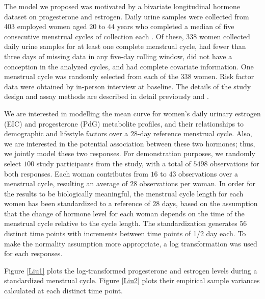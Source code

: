 \documentclass[article,lineno]{biometrika}
\begin{document}
The model we proposed was motivated by a bivariate longitudinal hormone dataset on progesterone and estrogen.
Daily urine samples were collected from 403 employed women aged $20$ to $44$ years who completed a median of five consecutive menstrual cycles of collection each \cite{Gold:Eske:Lasl:Samu:O'Nei:Over:Sche:quan:1995}. Of these, $338$ women collected daily urine samples for at least one complete menstrual cycle, had fewer than three days of missing data in any five-day rolling window, did not have a conception in the analyzed cycles, and had complete covariate information. One menstrual cycle was randomly selected from each of the $338$ women. 
Risk factor data were obtained by in-person interview at baseline. The details of the study design and assay methods are described in detail previously \cite{Gold:Eske:Lasl:Samu:O'Nei:Over:Sche:quan:1995} and \cite{Gold:Eske:Hamm:Lasl:Samu:O'Nei:Hine:Over:Sche:quan:1995}. 


We are interested in modelling the mean curve for women's daily urinary estrogen (EIC) and progesterone (PdG) metabolite profiles, and their relationships to demographic and lifestyle factors over a $28$-day reference menstrual cycle. Also, we are interested in the potential association between these two hormones; thus, we jointly model these two responses. 
For demonstration purposes, we randomly select  $100$ study participants from the study, with a total of $5498$ observations for both responses. 
Each woman contributes from $16$ to $43$ observations over a menstrual cycle, resulting an average of $28$ observations per woman.
In order for the results to be biologically meaningful, the menstrual cycle length for each women has been standardized to a reference of $28$ days, based on the assumption that the change of hormone level for each woman depends on the time of the menstrual cycle relative to the cycle length. The standardization generates $56$ distinct time points with increments between time points of 1/2 day each. To make the normality assumption more appropriate, a log transformation was used for each responses. 

Figure \ref{Liu1} plots the log-transformed progesterone and estrogen levels during a standardized menstrual cycle. Figure \ref{Liu2} plots their empirical sample variances calculated at each distinct time point. 
\end{document}
